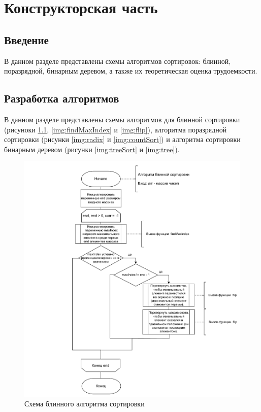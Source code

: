 \chapter{Конструкторская часть}

\section{Введение}
В данном разделе представлены схемы алгоритмов сортировок: блинной, поразрядной, бинарным деревом, а также их теоретическая оценка трудоемкости.

\section{Разработка алгоритмов}
В данном разделе представлены схемы алгоритмов для блинной сортировки (рисуноки \ref{img:pancake}, \ref{img:findMaxIndex} и \ref{img:flip}), алгоритма поразрядной сортировки (рисунки \ref{img:radix} и \ref{img:countSort}) и алгоритма сортировки бинарным деревом (рисунки \ref{img:treeSort} и \ref{img:tree}).

\begin{figure}[h]
	\centering
	\includegraphics[width=1\linewidth]{img/pancake.pdf}
	\caption{Схема блинного алгоритма сортировки}
	\label{img:pancake}
\end{figure}

